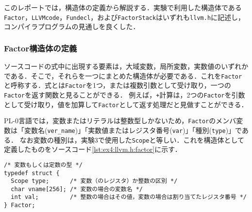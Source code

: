 \documentclass[uplatex]{jsarticle}
\begin{document}
このレポートでは，構造体の定義から解説する．実験で利用した構造体である\verb#Factor#，\verb#LLVMcode#，\verb#Fundecl#，および\verb#FactorStack#はいずれも\verb#llvm.h#に記述し，コンパイラプログラムの見通しを良くした．

\subsubsection{Factor構造体の定義}
ソースコードの式中に出現する要素は，大域変数，局所変数，実数値のいずれかである．そこで，それらを一つにまとめた構造体が必要である．これを\verb#Factor#と呼称する．式とは\verb#Factor#を1つ，または複数引数として受け取り，一つの\verb#Factor#を返す関数と見ることができる．
例えば，\verb#+#計算は，2つの\verb#Factor#を引数として受け取り，値を加算して\verb#Factor#として返す処理だと見做すことができる．

PL-0言語では，変数またはリテラルは整数型しかないため，\verb#Factor#のメンバ変数は「変数名(\verb#ver_name#)」「実数値またはレジスタ番号(\verb#var#)」「種別(\verb#type#)」である．
なお変数の種別は，実験3で使用した\verb#Scope#と等しい．これを構造体として定義したものをソースコード\ref{lst:ex4:llvm.h:factor}に示す．

\begin{lstlisting}[caption=変数および実数値を表す構造体Factor,label=lst:ex4:llvm.h:factor]
/* 変数もしくは定数の型 */
typedef struct {
  Scope type;      /* 変数（のレジスタ）か整数の区別 */
  char vname[256]; /* 変数の場合の変数名 */
  int val;         /* 整数の場合はその値，変数の場合は割り当てたレジスタ番号 */
} Factor;
\end{lstlisting}
\end{document}
